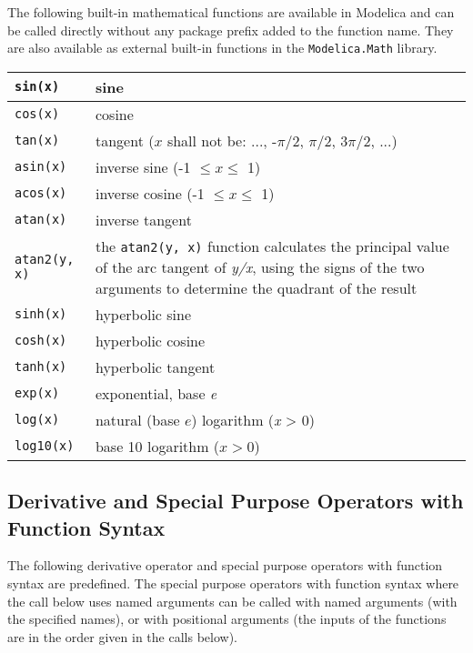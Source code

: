 The following built-in mathematical functions are available in Modelica
and can be called directly without any package prefix added to the
function name. They are also available as external built-in functions in
the \lstinline!Modelica.Math! library.

\begin{longtable}{|l|p{8cm}|}
\hline \endhead
\lstinline!sin(x)! & sine\\ \hline
\lstinline!cos(x)! & cosine\\ \hline
\lstinline!tan(x)! & tangent ($x$ shall not be: ..., -$\pi$/2, $\pi$/2, 3$\pi$/2, ...)\\ \hline
\lstinline!asin(x)! & inverse sine (-1 $\le x \le$ 1)\\ \hline
\lstinline!acos(x)! & inverse cosine (-1 $\le x \le$ 1)\\ \hline
\lstinline!atan(x)! & inverse tangent\\ \hline
\lstinline!atan2(y, x)! & the \lstinline!atan2(y, x)! function calculates the principal value of the arc tangent of \emph{y/x}, using the signs of the two arguments to determine the quadrant of the result\\ \hline
\lstinline!sinh(x)! & hyperbolic sine\\ \hline
\lstinline!cosh(x)! & hyperbolic cosine\\ \hline
\lstinline!tanh(x)! & hyperbolic tangent\\ \hline
\lstinline!exp(x)! & exponential, base \emph{e}\\ \hline
\lstinline!log(x)! & natural (base $e$) logarithm (\emph{x} \textgreater{} 0)\\ \hline
\lstinline!log10(x)! & base 10 logarithm ($x>0$)\\ \hline
\end{longtable}

\subsection{Derivative and Special Purpose Operators with Function Syntax}

The following derivative operator and special purpose operators with
function syntax are predefined. The special purpose operators with
function syntax where the call below uses named arguments can be called
with named arguments (with the specified names), or with positional
arguments (the inputs of the functions are in the order given in the
calls below).

